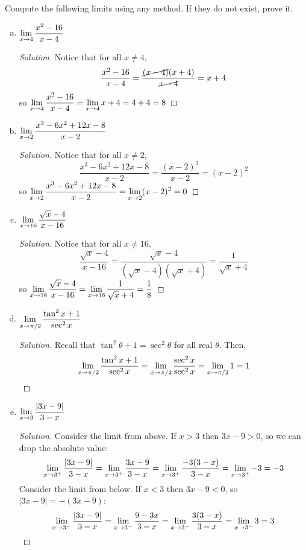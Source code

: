 \question Compute the following limits using any method.
If they do not exist, prove it.
\begin{enumerate}[(a)]
  \item $\displaystyle\lim_{x\to4} \frac{x^2-16}{x-4}$
        \begin{proof}[Solution]
          Notice that for all $x \neq 4$,
          \[ \frac{x^2-16}{x-4} = \frac{\cancel{(x-4)}(x+4)}{\cancel{x-4}}=x+4 \]
          so $\displaystyle\lim_{x\to4} \frac{x^2-16}{x-4} = \displaystyle\lim_{x\to4} x+4 = 4+4 = 8$
        \end{proof}
  \item $\displaystyle\lim_{x\to2} \frac{x^3-6x^2+12x-8}{x-2}$
        \begin{proof}[Solution]
          Notice that for all $x \neq 2$,
          \[ \frac{x^3-6x^2+12x-8}{x-2} = \frac{(x-2)^3}{x-2} = (x-2)^2 \]
          so $\displaystyle\lim_{x\to2} \frac{x^3-6x^2+12x-8}{x-2} = \displaystyle\lim_{x\to2} (x-2)^2 = 0$
        \end{proof}
  \item $\displaystyle\lim_{x\to16} \frac{\sqrt{x}-4}{x-16}$
        \begin{proof}[Solution]
          Notice that for all $x \neq 16$,
          \begin{equation*}
            \frac{\sqrt{x}-4}{x-16}
            = \frac{\sqrt{x}-4}{(\sqrt{x}-4)(\sqrt{x}+4)}
            = \frac{1}{\sqrt{x}+4}
          \end{equation*}
          so $\displaystyle\lim_{x\to16} \frac{\sqrt{x}-4}{x-16} = \displaystyle\lim_{x\to16} \frac{1}{\sqrt{x}+4} = \frac{1}{8}$
        \end{proof}
  \item $\displaystyle\lim_{x\to\pi/2} \frac{\tan^2 x+1}{\sec^2 x}$
        \begin{proof}[Solution]
          Recall that $\tan^2 \theta + 1 = \sec^2 \theta$ for all real $\theta$. Then,
          \begin{equation*}
            \displaystyle\lim_{x\to\pi/2} \frac{\tan^2 x+1}{\sec^2 x}
            = \displaystyle\lim_{x\to\pi/2} \frac{\sec^2 x}{\sec^2 x}
            = \displaystyle\lim_{x\to\pi/2} 1
            = 1 \qedhere
          \end{equation*}
        \end{proof}
  \item $\displaystyle\lim_{x\to3} \frac{|3x-9|}{3-x}$
        \begin{proof}[Solution]
          Consider the limit from above.
          If $x > 3$ then $3x-9 > 0$, so we can drop the absolute value:
          \begin{equation*}
            \displaystyle\lim_{x\to3^+} \frac{|3x-9|}{3-x}
            = \displaystyle\lim_{x\to3^+} \frac{3x-9}{3-x}
            = \displaystyle\lim_{x\to3^+} \frac{-3(3-x)}{3-x}
            = \displaystyle\lim_{x\to3^+} -3
            = -3
          \end{equation*}
          Consider the limit from below.
          If $x < 3$ then $3x-9 < 0$, so $|3x-9| = -(3x-9)$:
          \begin{equation*}
            \displaystyle\lim_{x\to3^-} \frac{|3x-9|}{3-x}
            = \displaystyle\lim_{x\to3^-} \frac{9-3x}{3-x}
            = \displaystyle\lim_{x\to3^-} \frac{3(3-x)}{3-x}
            = \displaystyle\lim_{x\to3^-} 3
            = 3
          \end{equation*}


\end{proof}
\end{enumerate}
